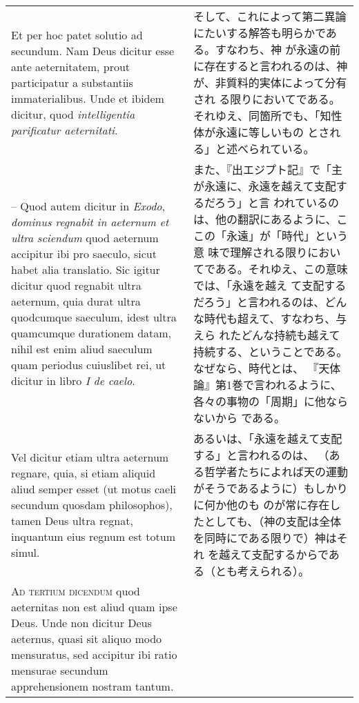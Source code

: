 \documentclass[10pt]{jsarticle} %
\begin{document}
\begin{longtable}{p{21em}p{21em}}
\\


Et per hoc patet solutio ad secundum. Nam Deus dicitur esse ante
aeternitatem, prout participatur a substantiis immaterialibus. Unde et
ibidem dicitur, quod {\it intelligentia parificatur aeternitati}. 

&

そして、これによって第二異論にたいする解答も明らかである。すなわち、神
が永遠の前に存在すると言われるのは、神が、非質料的実体によって分有され
る限りにおいてである。それゆえ、同箇所でも、「知性体が永遠に等しいもの
とされる」と述べられている。

\\

-- Quod autem
dicitur in {\it Exodo}, {\it dominus regnabit in aeternum et ultra
sciendum} quod aeternum accipitur ibi pro saeculo, sicut habet alia
translatio. Sic igitur dicitur quod regnabit ultra aeternum, quia durat
ultra quodcumque saeculum, idest ultra quamcumque durationem datam,
nihil est enim aliud saeculum quam periodus cuiuslibet rei, ut dicitur
in libro {\it I de caelo}. 

&

また、『出エジプト記』で「主が永遠に、永遠を越えて支配するだろう」と言
われているのは、他の翻訳にあるように、ここの「永遠」が「時代」という意
味で理解される限りにおいてである。それゆえ、この意味では、「永遠を越え
て支配するだろう」と言われるのは、どんな時代も超えて、すなわち、与えら
れたどんな持続も越えて持続する、ということである。なぜなら、時代とは、
『天体論』第1巻で言われるように、各々の事物の「周期」に他ならないから
である。

\\

Vel dicitur etiam ultra aeternum regnare,
quia, si etiam aliquid aliud semper esset (ut motus caeli secundum
quosdam philosophos), tamen Deus ultra regnat, inquantum eius regnum est
totum simul.  

&

あるいは、「永遠を越えて支配する」と言われるのは、
（ある哲学者たちによれば天の運動がそうであるように）もしかりに何か他のも
のが常に存在したとしても、（神の支配は全体を同時にである限りで）神はそれ
を越えて支配するからである（とも考えられる）。


\\


{\scshape Ad tertium dicendum} quod aeternitas non est aliud quam ipse
Deus. Unde non dicitur Deus aeternus, quasi sit aliquo modo mensuratus,
sed accipitur ibi ratio mensurae secundum apprehensionem nostram tantum.


\end{longtable}
\end{document}
